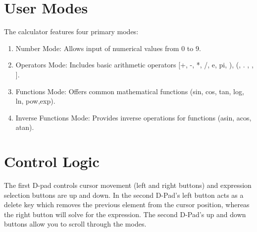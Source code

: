 \documentclass[journal]{IEEEtran}
\begin{document}
	\section{User Modes}
	The calculator features four primary modes:
	\begin{enumerate}
		\item Number Mode: Allows input of numerical values from 0 to 9.
		\item Operators Mode: Includes basic arithmetic operators [+, -, *, /, e, pi, ), (, . , , ].
		\item Functions Mode: Offers common mathematical functions (sin, cos, tan, log, ln, pow,exp).
		\item Inverse Functions Mode: Provides inverse operations for functions (asin, acos, atan).
	\end{enumerate}
	
	\section{Control Logic}
	The first D-pad controls cursor movement (left and right buttons) and expression selection buttons are up and down. In the second D-Pad's left button acts as a delete key which removes the previous element from the cursor position, whereas the right button will solve for the expression. The second D-Pad's up and down buttons allow you to scroll through the modes.
\end{document}
